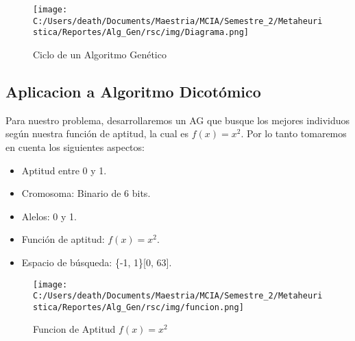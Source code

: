 \begin{figure}[H]
    \centering
    \texttt{[image: C:/Users/death/Documents/Maestria/MCIA/Semestre\_2/Metaheuristica/Reportes/Alg\_Gen/rsc/img/Diagrama.png]}
    \caption{Ciclo de un Algoritmo Genético}
    \label{diag}
\end{figure}

\subsection{Aplicacion a Algoritmo Dicotómico}

Para nuestro problema, desarrollaremos un AG que busque los mejores individuos según nuestra función de aptitud, la cual es $f(x) = x^2$.
Por lo tanto tomaremos en cuenta los siguientes aspectos:

\begin{itemize}
    \item Aptitud entre 0 y 1.
    \item Cromosoma: Binario de 6 bits.
    \item Alelos: 0 y 1.
    \item Función de aptitud: $f(x) = x^2$.
    \item Espacio de búsqueda: \{-1, 1\}[0, 63].
\end{itemize}

\begin{figure} [H]
    \centering
    \texttt{[image: C:/Users/death/Documents/Maestria/MCIA/Semestre\_2/Metaheuristica/Reportes/Alg\_Gen/rsc/img/funcion.png]}
    \caption{Funcion de Aptitud $f(x) = x^2$}
    \label{funcion}
\end{figure}